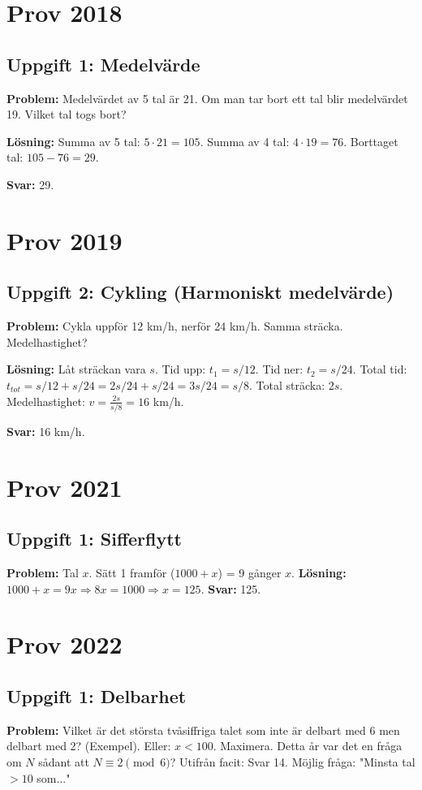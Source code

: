 \documentclass[11pt, a4paper]{article}
\begin{document}
\newpage

\section{Prov 2018}
\subsection{Uppgift 1: Medelvärde}
\textbf{Problem:} Medelvärdet av 5 tal är 21. Om man tar bort ett tal blir medelvärdet 19. Vilket tal togs bort?

\textbf{Lösning:}
Summa av 5 tal: $5 \cdot 21 = 105$.
Summa av 4 tal: $4 \cdot 19 = 76$.
Borttaget tal: $105 - 76 = 29$.

\textbf{Svar:} 29.

\newpage

\section{Prov 2019}
\subsection{Uppgift 2: Cykling (Harmoniskt medelvärde)}
\textbf{Problem:} Cykla uppför 12 km/h, nerför 24 km/h. Samma sträcka. Medelhastighet?

\textbf{Lösning:}
Låt sträckan vara $s$.
Tid upp: $t_1 = s/12$.
Tid ner: $t_2 = s/24$.
Total tid: $t_{tot} = s/12 + s/24 = 2s/24 + s/24 = 3s/24 = s/8$.
Total sträcka: $2s$.
Medelhastighet: $v = \frac{2s}{s/8} = 16$ km/h.

\textbf{Svar:} 16 km/h.

\newpage

\section{Prov 2021}
\subsection{Uppgift 1: Sifferflytt}
\textbf{Problem:} Tal $x$. Sätt 1 framför ($1000+x$) = 9 gånger $x$.
\textbf{Lösning:} $1000+x = 9x \Rightarrow 8x=1000 \Rightarrow x=125$.
\textbf{Svar:} 125.

\newpage

\section{Prov 2022}
\subsection{Uppgift 1: Delbarhet}
\textbf{Problem:} Vilket är det största tvåsiffriga talet som inte är delbart med 6 men delbart med 2? (Exempel).
Eller: $x < 100$. Maximera.
Detta år var det en fråga om $N$ sådant att $N \equiv 2 \pmod 6$?
Utifrån facit: Svar 14.
Möjlig fråga: "Minsta tal $>10$ som..."
\end{document}
